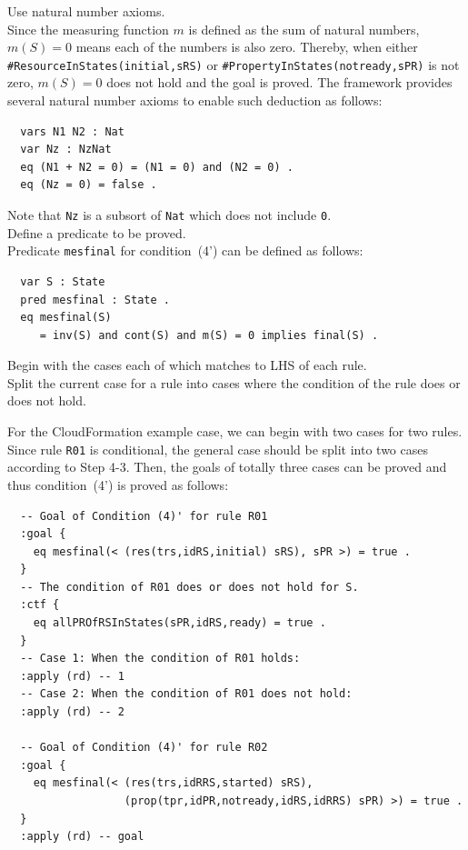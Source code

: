 \documentclass[12pt]{report}
\newcommand{\stt}[1]{{\small{\tt {#1}}}}
\begin{document}
 Use natural number axioms. \\
Since the measuring function $m$ is defined as the sum of natural
numbers, $m(S) = 0$ means each of the numbers is also zero. Thereby,
when either \stt{\#ResourceInStates(initial,sRS)} or
\stt{\#PropertyInStates(notready,sPR)} is not zero, $m(S) = 0$ does
not hold and the goal is proved. The framework provides
several natural number axioms to enable such deduction as follows:
\small
\begin{verbatim}
  vars N1 N2 : Nat
  var Nz : NzNat
  eq (N1 + N2 = 0) = (N1 = 0) and (N2 = 0) .
  eq (Nz = 0) = false .
\end{verbatim}
\normalsize
Note that {\tt Nz} is a subsort of {\tt Nat} which does not
include {\tt 0}.\\

 Define a predicate to be proved. \\ Predicate
         {\tt mesfinal} for condition~(4') can be defined as follows:
\small
\begin{verbatim}
  var S : State
  pred mesfinal : State .
  eq mesfinal(S)
     = inv(S) and cont(S) and m(S) = 0 implies final(S) .
\end{verbatim}
\normalsize

 Begin with the cases each of which matches to
LHS of each rule. \\ 
 Split the current case for a rule into
cases where the condition of the rule does or does not hold. 

For the CloudFormation example case, we can begin with two cases for
two rules. Since rule {\tt R01} is conditional, the general case
should be split into two cases according to Step 4-3. Then, the goals
of totally three cases can be proved and thus condition~(4') is proved
as follows:
\small
\begin{verbatim}
  -- Goal of Condition (4)' for rule R01
  :goal {
    eq mesfinal(< (res(trs,idRS,initial) sRS), sPR >) = true .
  }
  -- The condition of R01 does or does not hold for S.
  :ctf {
    eq allPROfRSInStates(sPR,idRS,ready) = true .
  }
  -- Case 1: When the condition of R01 holds:
  :apply (rd) -- 1
  -- Case 2: When the condition of R01 does not hold:
  :apply (rd) -- 2

  -- Goal of Condition (4)' for rule R02
  :goal {
    eq mesfinal(< (res(trs,idRRS,started) sRS),
                  (prop(tpr,idPR,notready,idRS,idRRS) sPR) >) = true .
  }
  :apply (rd) -- goal
\end{verbatim}
\normalsize
\end{document}
